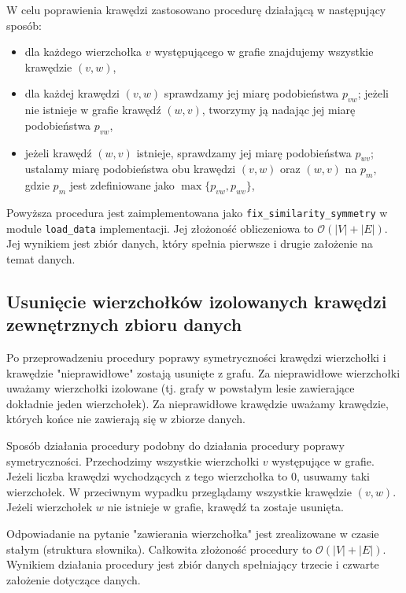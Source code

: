 \documentclass[a4paper,10pt]{article}
\begin{document}
W celu poprawienia krawędzi zastosowano procedurę działającą w następujący sposób:
\begin{itemize}
 \item dla każdego wierzchołka $v$ występującego w grafie znajdujemy wszystkie krawędzie $\left(v, w\right)$,
 \item dla każdej krawędzi $\left(v, w\right)$ sprawdzamy jej miarę podobieństwa $p_{vw}$; jeżeli nie istnieje w grafie krawędź $\left(w, v\right)$, tworzymy ją nadając jej miarę podobieństwa $p_{vw}$,
 \item jeżeli krawędź $\left(w, v\right)$ istnieje, sprawdzamy jej miarę podobieństwa $p_{wv}$; ustalamy miarę podobieństwa obu krawędzi $\left(v, w\right)$ oraz $\left(w, v\right)$ na $p_{m}$, gdzie $p_{m}$ jest zdefiniowane jako $\max\{p_{vw}, p_{wv}\}$,
\end{itemize}

Powyższa procedura jest zaimplementowana jako \texttt{fix\_similarity\_symmetry} w module \texttt{load\_data} implementacji. Jej złożoność obliczeniowa to $\mathcal{O}\left(\left|V\right| + \left|E\right|\right)$. Jej wynikiem jest zbiór danych, który spełnia pierwsze i drugie założenie na temat danych.

\subsection{Usunięcie wierzchołków izolowanych krawędzi zewnętrznych zbioru danych} 

Po przeprowadzeniu procedury poprawy symetryczności krawędzi wierzchołki i krawędzie "nieprawidłowe" zostają usunięte z grafu. Za nieprawidłowe wierzchołki uważamy wierzchołki izolowane (tj. grafy w powstałym lesie zawierające dokładnie jeden wierzchołek). Za nieprawidłowe krawędzie uważamy krawędzie, których końce nie zawierają się w zbiorze danych.

Sposób działania procedury podobny do działania procedury poprawy symetryczności. Przechodzimy wszystkie wierzchołki $v$ występujące w grafie. Jeżeli liczba krawędzi wychodzących z tego wierzchołka to $0$, usuwamy taki wierzchołek. W przeciwnym wypadku przeglądamy wszystkie krawędzie $\left(v, w\right)$. Jeżeli wierzchołek $w$ nie istnieje w grafie, krawędź ta zostaje usunięta.

Odpowiadanie na pytanie "zawierania wierzchołka" jest zrealizowane w czasie stałym (struktura słownika). Całkowita złożoność procedury to $\mathcal{O}\left(\left|V\right| + \left|E\right|\right)$. Wynikiem działania procedury jest zbiór danych spełniający trzecie i czwarte założenie dotyczące danych.
\end{document}
